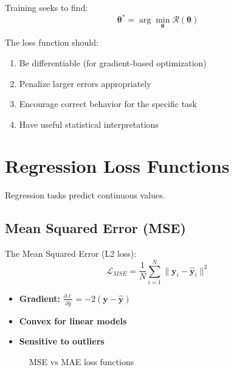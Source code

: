 Training seeks to find:
\begin{equation}
\mathbf{\theta}^* = \arg\min_{\mathbf{\theta}} \mathcal{R}(\mathbf{\theta})
\end{equation}

The loss function should:
\begin{enumerate}
    \item Be differentiable (for gradient-based optimization)
    \item Penalize larger errors appropriately
    \item Encourage correct behavior for the specific task
    \item Have useful statistical interpretations
\end{enumerate}

\section{Regression Loss Functions}

Regression tasks predict continuous values.

\subsection{Mean Squared Error (MSE)}

The Mean Squared Error (L2 loss):
\begin{equation}
\mathcal{L}_{MSE} = \frac{1}{N}\sum_{i=1}^{N} \|\mathbf{y}_i - \hat{\mathbf{y}}_i\|^2
\end{equation}

\begin{properties}
\begin{itemize}
    \item \textbf{Gradient:} $\frac{\partial \ell}{\partial \hat{y}} = -2(\mathbf{y} - \hat{\mathbf{y}})$
    \item \textbf{Convex for linear models}
    \item \textbf{Sensitive to outliers}
\end{itemize}
\end{properties}

\begin{figure}[h]
    \centering
    \caption{MSE vs MAE loss functions}
    \label{fig:mse_mae}
\end{figure}


